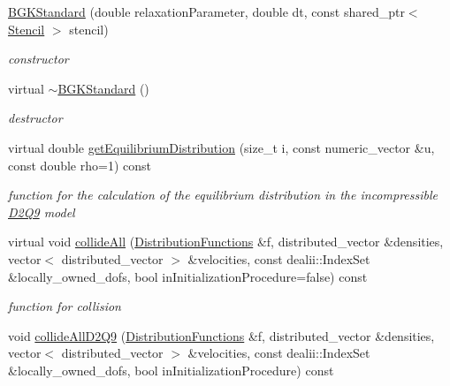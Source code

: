 \begin{DoxyCompactItemize}
\item 
\hypertarget{classnatrium_1_1BGKStandard_a47cd5ef20c46be121f2e2306f2e6b05b}{
\hyperlink{classnatrium_1_1BGKStandard_a47cd5ef20c46be121f2e2306f2e6b05b}{BGKStandard} (double relaxationParameter, double dt, const shared\_\-ptr$<$ \hyperlink{classnatrium_1_1Stencil}{Stencil} $>$ stencil)}
\label{classnatrium_1_1BGKStandard_a47cd5ef20c46be121f2e2306f2e6b05b}

\begin{DoxyCompactList}\small\item\em constructor \item\end{DoxyCompactList}\item 
virtual \hyperlink{classnatrium_1_1BGKStandard_aa55035be79098a762cf4f0ef308d41e5}{$\sim$BGKStandard} ()
\begin{DoxyCompactList}\small\item\em destructor \item\end{DoxyCompactList}\item 
virtual double \hyperlink{classnatrium_1_1BGKStandard_a3d45ef2fe5536bf14914f99297477754}{getEquilibriumDistribution} (size\_\-t i, const numeric\_\-vector \&u, const double rho=1) const 
\begin{DoxyCompactList}\small\item\em function for the calculation of the equilibrium distribution in the incompressible \hyperlink{classnatrium_1_1D2Q9}{D2Q9} model \item\end{DoxyCompactList}\item 
virtual void \hyperlink{classnatrium_1_1BGKStandard_a8e0493b063d56275d7ee607e25c4145e}{collideAll} (\hyperlink{classnatrium_1_1DistributionFunctions}{DistributionFunctions} \&f, distributed\_\-vector \&densities, vector$<$ distributed\_\-vector $>$ \&velocities, const dealii::IndexSet \&locally\_\-owned\_\-dofs, bool inInitializationProcedure=false) const 
\begin{DoxyCompactList}\small\item\em function for collision \item\end{DoxyCompactList}\item 
\hypertarget{classnatrium_1_1BGKStandard_aaaad49afea2e7079645b49380d990254}{
void \hyperlink{classnatrium_1_1BGKStandard_aaaad49afea2e7079645b49380d990254}{collideAllD2Q9} (\hyperlink{classnatrium_1_1DistributionFunctions}{DistributionFunctions} \&f, distributed\_\-vector \&densities, vector$<$ distributed\_\-vector $>$ \&velocities, const dealii::IndexSet \&locally\_\-owned\_\-dofs, bool inInitializationProcedure) const }
\label{classnatrium_1_1BGKStandard_aaaad49afea2e7079645b49380d990254}


\end{DoxyCompactItemize}
